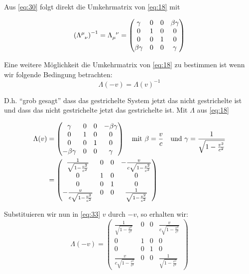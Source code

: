 Aus \eqref{eq:30} folgt direkt die Umkehrmatrix von \eqref{eq:18} mit

\begin{equation}
  \label{eq:31}
   \left(\Lambda^\mu_{\hphantom\mu \nu}\right)^{-1} 
   = \Lambda_{\mu}^{\hphantom \mu \nu}=
  \begin{pmatrix}
    \gamma&0&0&\beta\gamma\\
    0&1&0&0\\
    0&0&1&0\\
    \beta\gamma&0&0&\gamma
  \end{pmatrix}
\end{equation}

Eine weitere Möglichkeit die Umkehrmatrix von \eqref{eq:18} zu bestimmen ist
wenn wir folgende Bedingung betrachten:
\begin{equation}
  \label{eq:32}
  \Lambda(-v) = \Lambda(v)^{-1}
\end{equation}

D.h. ``grob gesagt'' dass das gestrichelte System jetzt das nicht gestrichelte
ist und dass das nicht gestrichelte jetzt das gestrichelte ist. Mit \(\Lambda\)
aus \eqref{eq:18}

\begin{align}
  \label{eq:33}
   \Lambda(v) &=
  \begin{pmatrix}
    \gamma&0&0&-\beta\gamma\\
    0&1&0&0\\
    0&0&1&0\\
    -\beta\gamma&0&0&\gamma
  \end{pmatrix}
  \quad\text{mit }
  \beta = \frac{v}{c}\quad\text{und }
  \gamma = \frac{1}{\sqrt{1-\frac{v^2}{c^2}}}\notag\\
   &=
  \begin{pmatrix}
    \frac{1}{\sqrt{1-\frac{v^2}{c^2}}}&0&0&-\frac{v}{c\sqrt{1-\frac{v^2}{c^2}}}\\
    0&1&0&0\\
    0&0&1&0\\
    -\frac{v}{c\sqrt{1-\frac{v^2}{c^2}}}&0&0&\frac{1}{\sqrt{1-\frac{v^2}{c^2}}}
  \end{pmatrix}
\end{align}

Substituieren wir nun in \eqref{eq:33} \(v\) durch \(-v\), so erhalten wir:
\begin{equation}
  \label{eq:34}
  \Lambda(-v)=
   \begin{pmatrix}
    \frac{1}{\sqrt{1-\frac{v^2}{c^2}}}&0&0&\frac{v}{c\sqrt{1-\frac{v^2}{c^2}}}\\
    0&1&0&0\\
    0&0&1&0\\
    \frac{v}{c\sqrt{1-\frac{v^2}{c^2}}}&0&0&\frac{1}{\sqrt{1-\frac{v^2}{c^2}}}
  \end{pmatrix}
\end{equation}

